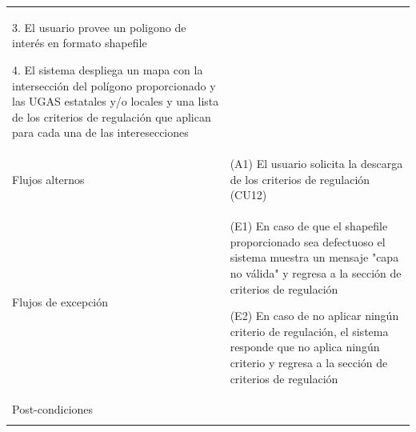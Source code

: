 \begin{longtable}{@{\extracolsep{8pt}}l p{8.5cm}}
 3. El usuario provee un poligono de interés en formato shapefile \par\vspace{.1cm}

 4. El sistema despliega un mapa con la intersección del polígono proporcionado y las UGAS estatales y/o locales y una lista de los criterios de regulación que aplican para cada una de las interesecciones \par\vspace{.1cm}

\\

\hspace{.2cm}Flujos alternos &
\par (A1) El usuario solicita la descarga de los criterios de regulación (CU12)



\\

\hspace{.2cm}Flujos de excepción &
\par\vspace{.1cm} (E1) En caso de que el shapefile proporcionado sea defectuoso el sistema muestra un mensaje "capa no válida" y regresa a la sección de criterios de regulación

\par\vspace{.1cm} (E2) En caso de no aplicar ningún criterio de regulación, el sistema responde que no aplica ningún criterio y regresa a la sección de criterios de regulación


\\%

\hspace{.2cm}Post-condiciones &
\\
\hline

 \\
\end{longtable}
\endgroup


\pagebreak





